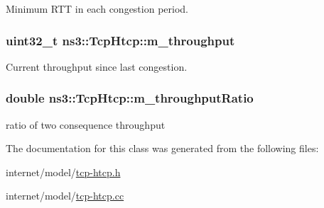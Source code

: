 Minimum R\+TT in each congestion period. 

\subsubsection[{\texorpdfstring{m\+\_\+throughput}{m_throughput}}]{\setlength{\rightskip}{0pt plus 5cm}uint32\+\_\+t ns3\+::\+Tcp\+Htcp\+::m\+\_\+throughput\hspace{0.3cm}{\ttfamily [private]}}\hypertarget{classns3_1_1TcpHtcp_aff553c6ce4a85bf1fcdc441dd5f7245d}{}\label{classns3_1_1TcpHtcp_aff553c6ce4a85bf1fcdc441dd5f7245d}


Current throughput since last congestion. 

\subsubsection[{\texorpdfstring{m\+\_\+throughput\+Ratio}{m_throughputRatio}}]{\setlength{\rightskip}{0pt plus 5cm}double ns3\+::\+Tcp\+Htcp\+::m\+\_\+throughput\+Ratio\hspace{0.3cm}{\ttfamily [private]}}\hypertarget{classns3_1_1TcpHtcp_a3ff9db9a1e69710b1e14516d55dc0357}{}\label{classns3_1_1TcpHtcp_a3ff9db9a1e69710b1e14516d55dc0357}


ratio of two consequence throughput 



The documentation for this class was generated from the following files\+:\begin{DoxyCompactItemize}
\item 
internet/model/\hyperlink{tcp-htcp_8h}{tcp-\/htcp.\+h}\item 
internet/model/\hyperlink{tcp-htcp_8cc}{tcp-\/htcp.\+cc}\end{DoxyCompactItemize}
